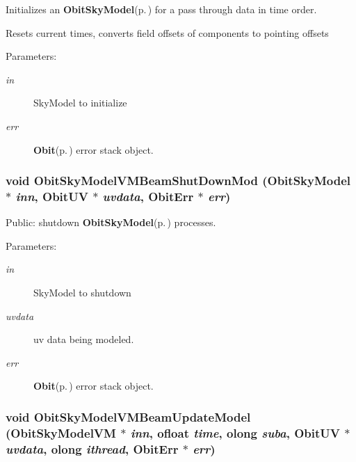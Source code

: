 Initializes an {\bf Obit\-Sky\-Model}{\rm (p.\,\pageref{structObitSkyModel})} for a pass through data in time order. 

Resets current times, converts field offsets of components to pointing offsets \begin{Desc}
\item[Parameters:]
\begin{description}
\item[{\em in}]Sky\-Model to initialize \item[{\em err}]{\bf Obit}{\rm (p.\,\pageref{structObit})} error stack object. \end{description}
\end{Desc}
\subsubsection{\setlength{\rightskip}{0pt plus 5cm}void Obit\-Sky\-Model\-VMBeam\-Shut\-Down\-Mod ({\bf Obit\-Sky\-Model} $\ast$ {\em inn}, {\bf Obit\-UV} $\ast$ {\em uvdata}, {\bf Obit\-Err} $\ast$ {\em err})}\label{ObitSkyModelVMBeam_8c_a17}


Public: shutdown {\bf Obit\-Sky\-Model}{\rm (p.\,\pageref{structObitSkyModel})} processes. 

\begin{Desc}
\item[Parameters:]
\begin{description}
\item[{\em in}]Sky\-Model to shutdown \item[{\em uvdata}]uv data being modeled. \item[{\em err}]{\bf Obit}{\rm (p.\,\pageref{structObit})} error stack object. \end{description}
\end{Desc}
\subsubsection{\setlength{\rightskip}{0pt plus 5cm}void Obit\-Sky\-Model\-VMBeam\-Update\-Model ({\bf Obit\-Sky\-Model\-VM} $\ast$ {\em inn}, {\bf ofloat} {\em time}, {\bf olong} {\em suba}, {\bf Obit\-UV} $\ast$ {\em uvdata}, {\bf olong} {\em ithread}, {\bf Obit\-Err} $\ast$ {\em err})}\label{ObitSkyModelVMBeam_8c_a19}


